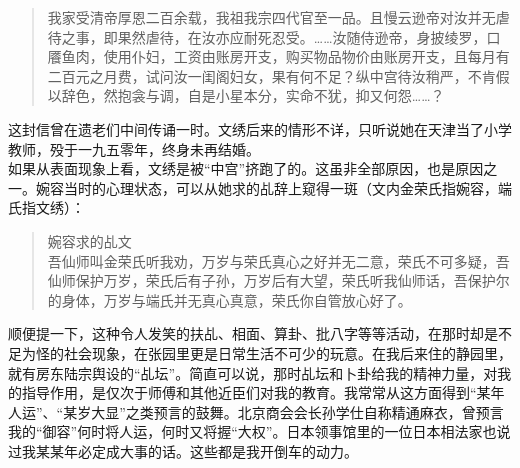 \begin{quote}
	我家受清帝厚恩二百余载，我祖我宗四代官至一品。且慢云逊帝对汝并无虐待之事，即果然虐待，在汝亦应耐死忍受。……汝随侍逊帝，身披绫罗，口餍鱼肉，使用仆妇，工资由账房开支，购买物品物价由账房开支，且每月有二百元之月费，试问汝一闺阁妇女，果有何不足？纵中宫待汝稍严，不肯假以辞色，然抱衾与调，自是小星本分，实命不犹，抑又何怨……？\\
\end{quote}

这封信曾在遗老们中间传诵一时。文绣后来的情形不详，只听说她在天津当了小学教师，殁于一九五零年，终身未再结婚。\\

如果从表面现象上看，文绣是被“中宫”挤跑了的。这虽非全部原因，也是原因之一。婉容当时的心理状态，可以从她求的乩辞上窥得一斑（文内金荣氏指婉容，端氏指文绣）：\\

\begin{quote}
	婉容求的乩文\\

吾仙师叫金荣氏听我劝，万岁与荣氏真心之好并无二意，荣氏不可多疑，吾仙师保护万岁，荣氏后有子孙，万岁后有大望，荣氏听我仙师话，吾保护尔的身体，万岁与端氏并无真心真意，荣氏你自管放心好了。\\
\end{quote}

顺便提一下，这种令人发笑的扶乩、相面、算卦、批八字等等活动，在那时却是不足为怪的社会现象，在张园里更是日常生活不可少的玩意。在我后来住的静园里，就有房东陆宗舆设的“乩坛”。简直可以说，那时乩坛和卜卦给我的精神力量，对我的指导作用，是仅次于师傅和其他近臣们对我的教育。我常常从这方面得到“某年人运”、“某岁大显”之类预言的鼓舞。北京商会会长孙学仕自称精通麻衣，曾预言我的“御容”何时将人运，何时又将握“大权”。日本领事馆里的一位日本相法家也说过我某某年必定成大事的话。这些都是我开倒车的动力。\\